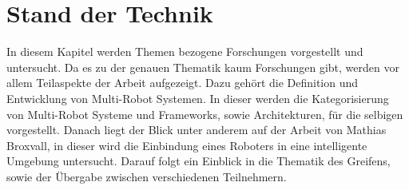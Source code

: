 \section{Stand der Technik}
\label{sec:relatedwork}

In diesem Kapitel werden Themen bezogene Forschungen vorgestellt und untersucht. Da es zu der genauen Thematik kaum Forschungen gibt, werden vor allem Teilaspekte der Arbeit aufgezeigt. Dazu gehört die Definition und Entwicklung von Multi-Robot Systemen. In dieser werden die Kategorisierung von Multi-Robot Systeme und Frameworks, sowie Architekturen, für die selbigen vorgestellt. Danach liegt der Blick unter anderem auf der Arbeit von Mathias Broxvall, in dieser wird die Einbindung eines Roboters in eine intelligente Umgebung untersucht. Darauf folgt ein Einblick in die Thematik des Greifens, sowie der Übergabe zwischen verschiedenen Teilnehmern.




